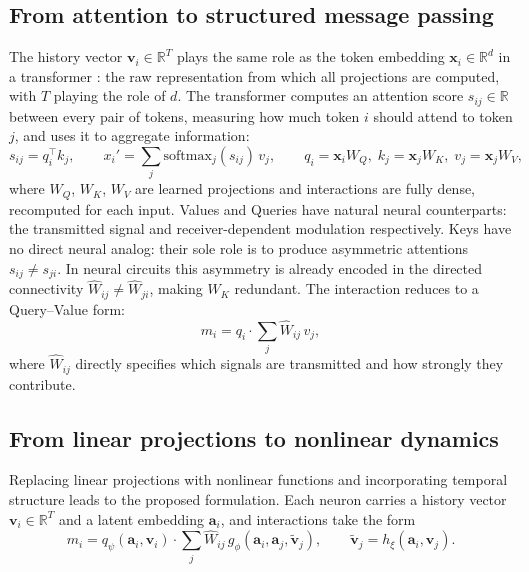 \documentclass[11pt]{article}
\begin{document}
\subsection{From attention to structured message passing}

The history vector $\mathbf{v}_i \in \mathbb{R}^T$ plays the same
role as the token embedding $\mathbf{x}_i \in \mathbb{R}^d$ in a
transformer \citep{vaswani2017}: the raw representation from which
all projections are computed, with $T$ playing the role of $d$.
The transformer computes an attention score $s_{ij} \in \mathbb{R}$
between every pair of tokens, measuring how much token $i$ should
attend to token $j$, and uses it to aggregate information:
\begin{equation}
s_{ij} = q_i^\top k_j, \qquad
x_i' = \sum_j \mathrm{softmax}_j\!\left(s_{ij}\right)\, v_j,
\qquad
q_i = \mathbf{x}_i W_Q,\;
k_j = \mathbf{x}_j W_K,\;
v_j = \mathbf{x}_j W_V,
\label{eq:transformer}
\end{equation}
where $W_Q$, $W_K$, $W_V$ are learned projections and interactions
are fully dense, recomputed for each input. Values and Queries have natural neural counterparts: the transmitted
signal and receiver-dependent modulation respectively.
Keys have no direct neural analog: their sole role is to produce
asymmetric attentions $s_{ij} \neq s_{ji}$. In neural circuits this asymmetry is already
encoded in the directed connectivity $\hat{W}_{ij} \neq
\hat{W}_{ji}$, making $W_K$ redundant. The interaction reduces
to a Query--Value form:
\begin{equation}
m_i = q_i \cdot \sum_j \hat{W}_{ij}\, v_j,
\end{equation}
where $\hat{W}_{ij}$ directly specifies which signals are transmitted and how strongly they contribute.
\subsection{From linear projections to nonlinear dynamics}

Replacing linear projections with nonlinear functions and incorporating temporal structure leads to the proposed formulation. Each neuron carries a history vector $\mathbf{v}_i \in \mathbb{R}^T$ and a latent embedding $\mathbf{a}_i$, and interactions take the form
\begin{equation}
m_i =
q_\psi(\mathbf{a}_i,\mathbf{v}_i)
\cdot
\sum_j \hat{W}_{ij}\,
g_\phi(\mathbf{a}_i,\mathbf{a}_j,\tilde{\mathbf{v}}_j),
\qquad
\tilde{\mathbf{v}}_j = h_\xi(\mathbf{a}_i,\mathbf{v}_j).
\end{equation}
\end{document}
